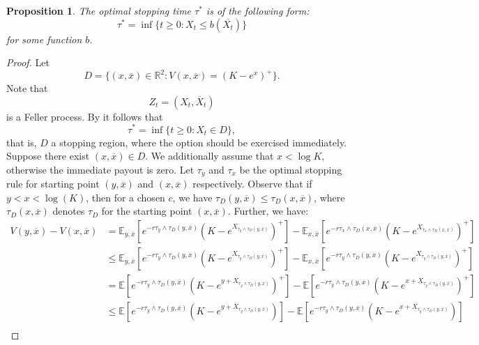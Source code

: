 \documentclass[10pt]{amsart}
\def\E{{\mathbb{E}}}
\def \R{{{\rm I{\!}\rm R}}}
\def\E{{\mathbb E}} \def\PP{\mc P} \def\Z{{\mathbb Z}} \def\R{{\mathbb R}}
\newtheorem{Prop}{Proposition}
\begin{document}
	\begin{Prop}\label{thm1}
		The optimal stopping time $\tau^*$ is of the following form:
		\begin{equation*}
			\tau^* = \inf \{ t \geq 0: X_t \leq b(\overline{X_t}) \}
		\end{equation*}
		for some function $b$.
	\end{Prop}
	\begin{proof}
		Let
		\begin{equation*}
			D = \{ (x,\overline{x})\in \mathbb{R}^2: V(x, \overline{x}) = (K - e^x)^+ \}.
		\end{equation*}
		Note that
		\begin{equation*}
			Z_t = (X_t,\overline{X}_t)
		\end{equation*}
		is a Feller process.
		By \cite[Thm. 2.7, p. 40 and (2.2.80), p. 49]{PS} it follows that $$\tau^*=\inf\{t\geq 0: X_t\in D\},$$
that is, $D$ a stopping region, where the option should be exercised immediately.
		Suppose there exist $(x,\overline{x}) \in D$. We additionally assume that $x < \log K$, otherwise the immediate payout is zero. Let $\tau_y$ and $\tau_x$ be the optimal stopping rule for starting point $(y, \overline{x})$ and $(x, \overline{x})$ respectively. Observe that if $y < x < \log(K)$, then for a chosen $c$, we have $\tau_D(y, \overline{x}) \leq \tau_D(x,\overline{x})$, where $\tau_D(x,\overline{x})$ denotes $\tau_D$ for the starting point $(x, \overline{x})$. Further, we have:
		\begin{align*}
			V(y, \overline{x}) - V(x, \overline{x}) &= \E_{y,\overline{x}}[e^{-r\tau_y\wedge\tau_D(y,\overline{x})}(K - e^{X_{\tau_y\wedge\tau_D(y,\overline{x})}})^+] - \E_{x,\overline{x}}[e^{-r\tau_x\wedge\tau_D(x,\overline{x})}(K - e^{X_{\tau_x\wedge\tau_D(x,\overline{x})}})^+] \\
			&\leq \E_{y,\overline{x}}[e^{-r\tau_y\wedge\tau_D(y,\overline{x})}(K - e^{X_{\tau_y\wedge\tau_D(y,\overline{x})}})^+] - \E_{x,\overline{x}}[e^{-r\tau_y\wedge\tau_D(y,\overline{x})}(K - e^{X_{\tau_y\wedge\tau_D(y,\overline{x})}})^+] \\
			& = \E[e^{-r\tau_y\wedge\tau_D(y,\overline{x})}(K - e^{y + X_{\tau_y\wedge\tau_D(y,\overline{x})}})^+] - \E[e^{-r\tau_y\wedge\tau_D(y,\overline{x})}(K - e^{x + X_{\tau_y\wedge\tau_D(y,\overline{x})}})^+] \\
			& \leq \E[e^{-r\tau_y\wedge\tau_D(y,\overline{x})}(K - e^{y + X_{\tau_y\wedge\tau_D(y,\overline{x})}})] - \E[e^{-r\tau_y\wedge\tau_D(y,\overline{x})}(K - e^{x + X_{\tau_y\wedge\tau_D(y,\overline{x})}})] \\

\end{align*}
\end{proof}
\end{document}
